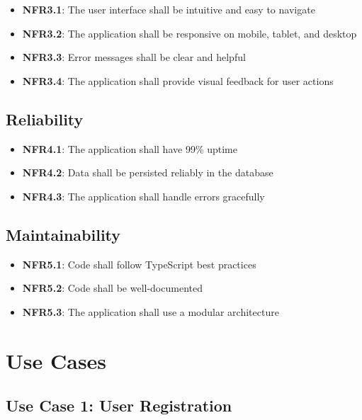 \begin{itemize}
    \item \textbf{NFR3.1}: The user interface shall be intuitive and easy to navigate
    \item \textbf{NFR3.2}: The application shall be responsive on mobile, tablet, and desktop
    \item \textbf{NFR3.3}: Error messages shall be clear and helpful
    \item \textbf{NFR3.4}: The application shall provide visual feedback for user actions
\end{itemize}

\subsection{Reliability}

\begin{itemize}
    \item \textbf{NFR4.1}: The application shall have 99\% uptime
    \item \textbf{NFR4.2}: Data shall be persisted reliably in the database
    \item \textbf{NFR4.3}: The application shall handle errors gracefully
\end{itemize}

\subsection{Maintainability}

\begin{itemize}
    \item \textbf{NFR5.1}: Code shall follow TypeScript best practices
    \item \textbf{NFR5.2}: Code shall be well-documented
    \item \textbf{NFR5.3}: The application shall use a modular architecture
\end{itemize}

\section{Use Cases}

\subsection{Use Case 1: User Registration}

